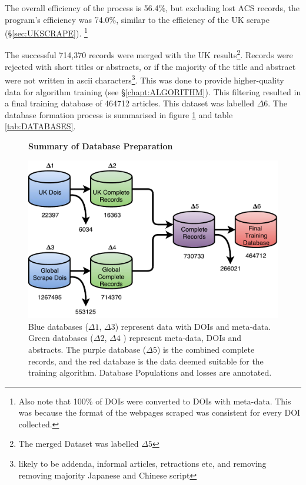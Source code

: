 The overall efficiency of the process is 56.4\%, but excluding lost ACS records, the program's efficiency was 74.0\%, similar to the efficiency of the UK scrape (\S\ref{sec:UKSCRAPE}). \footnote{Also note that 100\% of DOIs were converted to DOIs with meta-data. This was because the format of the webpages scraped was consistent for every DOI collected.}

The successful 714,370 records were merged with the UK results\footnote{The merged Dataset was labelled $\Delta5$}. Records were rejected with short titles or abstracts, or if the majority of the title and abstract were not written in ascii characters\footnote{likely to be addenda, informal articles, retractions etc, and removing removing majority Japanese and Chinese script}. This was done to provide higher-quality data for algorithm training (see \S\ref{chapt:ALGORITHM}). This filtering resulted in a final training database of 464712 articles. This dataset was labelled $\Delta6$. The database formation process is summarised in figure \ref{fig:DATABASES} and table \ref{tab:DATABASES}.
\begin{figure}[H]
    \centering
    \textbf{Summary of Database Preparation}\par\medskip
    \includegraphics[scale=0.6]{Data_Acquisition/Databases2.pdf}
    \caption[Summary of Database Preparation]{Blue databases ($\Delta1$, $\Delta3$) represent data with DOIs and meta-data. Green databases ($\Delta2$, $\Delta4$ ) represent meta-data, DOIs and abstracts. The purple database ($\Delta5$) is the combined complete records, and the red database is the data deemed suitable for the training algorithm. Database Populations and losses are annotated.}
     \label{fig:DATABASES}
\end{figure}

